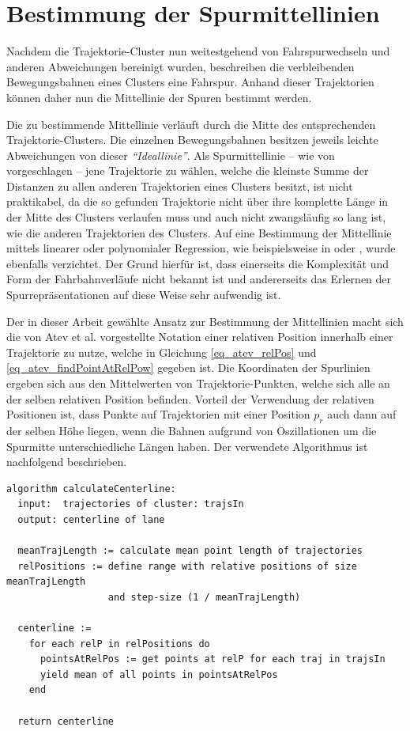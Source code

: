 \section{Bestimmung der Spurmittellinien}
\label{sec:real2_define_lane_centerline}

Nachdem die Trajektorie-Cluster nun weitestgehend von Fahrspurwechseln und anderen Abweichungen bereinigt
wurden, beschreiben die verbleibenden Bewegungsbahnen eines Clusters eine Fahrspur.
Anhand dieser Trajektorien können daher nun die Mittellinie der Spuren bestimmt werden.

Die zu bestimmende Mittellinie verläuft durch die Mitte des entsprechenden
Trajektorie-Clusters. Die einzelnen Bewegungsbahnen besitzen jeweils leichte Abweichungen von dieser
\textit{``Ideallinie''}.
Als Spurmittellinie -- wie von \cite{Hu2005} vorgeschlagen -- jene Trajektorie zu wählen, welche die
kleinste Summe der Distanzen zu allen anderen Trajektorien eines Clusters besitzt, ist nicht praktikabel,
da die so gefunden Trajektorie nicht über ihre komplette Länge in der Mitte des Clusters verlaufen muss
und auch nicht zwangsläufig so lang ist, wie die anderen Trajektorien des Clusters. 
Auf eine Bestimmung der Mittellinie mittels linearer oder polynomialer Regression, wie beispielsweise in
\cite[]{Chen2014} oder \cite[]{Melo2006},
wurde ebenfalls verzichtet. Der Grund hierfür ist, dass einerseits die Komplexität und Form der Fahrbahnverläufe
nicht bekannt ist und andererseits das Erlernen der Spurrepräsentationen auf diese Weise sehr aufwendig ist.

Der in dieser Arbeit gewählte Ansatz zur Bestimmung der Mittellinien macht sich die von Atev et al.
vorgestellte Notation einer relativen Position innerhalb einer Trajektorie zu nutze, welche in
Gleichung \ref{eq_atev_relPos} und \ref{eq_atev_findPointAtRelPow} gegeben ist.
Die Koordinaten der Spurlinien ergeben sich aus den Mittelwerten von Trajektorie-Punkten, welche sich
alle an der selben relativen Position befinden. Vorteil der Verwendung der relativen Positionen ist,
dass Punkte auf Trajektorien mit einer Position $p_r$ auch dann auf der selben Höhe liegen,
wenn die Bahnen aufgrund von Oszillationen um die Spurmitte unterschiedliche Längen haben.
Der verwendete Algorithmus ist nachfolgend beschrieben.
\begin{lstlisting}[caption=Pseudocode Cluster Post-Processing, language=Pseudo, label=lst:pseudo_post_processing]
algorithm calculateCenterline:
  input:  trajectories of cluster: trajsIn
  output: centerline of lane

  meanTrajLength := calculate mean point length of trajectories
  relPositions := define range with relative positions of size meanTrajLength
                  and step-size (1 / meanTrajLength)

  centerline :=
    for each relP in relPositions do
      pointsAtRelPos := get points at relP for each traj in trajsIn
      yield mean of all points in pointsAtRelPos
    end

  return centerline
\end{lstlisting}

